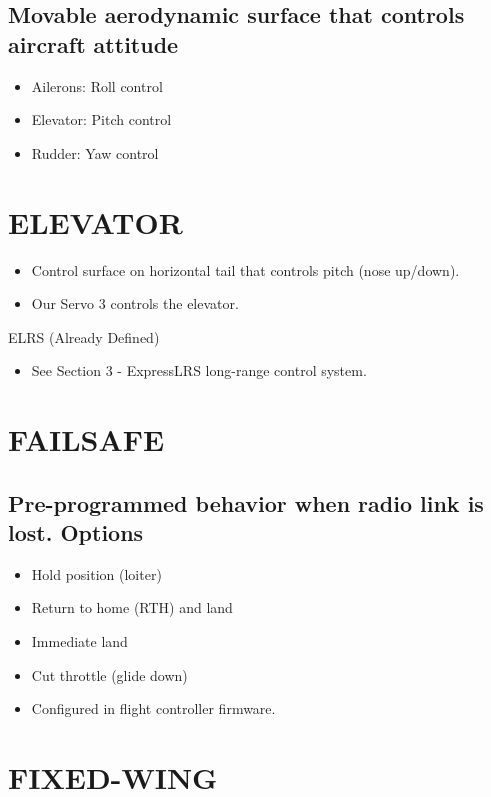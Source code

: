 \documentclass[11pt,letterpaper]{article}
\begin{document}
\subsection{Movable aerodynamic surface that controls aircraft attitude}

\begin{itemize}
  \item Ailerons: Roll control
  \item Elevator: Pitch control
  \item Rudder: Yaw control
\end{itemize}

\section{ELEVATOR}

\begin{itemize}
  \item Control surface on horizontal tail that controls pitch (nose up/down).
  \item Our Servo 3 controls the elevator.
\end{itemize}

ELRS (Already Defined)\par

\begin{itemize}
  \item See Section 3 - ExpressLRS long-range control system.
\end{itemize}

\section{FAILSAFE}

\subsection{Pre-programmed behavior when radio link is lost. Options}

\begin{itemize}
  \item Hold position (loiter)
  \item Return to home (RTH) and land
  \item Immediate land
  \item Cut throttle (glide down)
  \item Configured in flight controller firmware.
\end{itemize}

\section{FIXED-WING}
\end{document}
